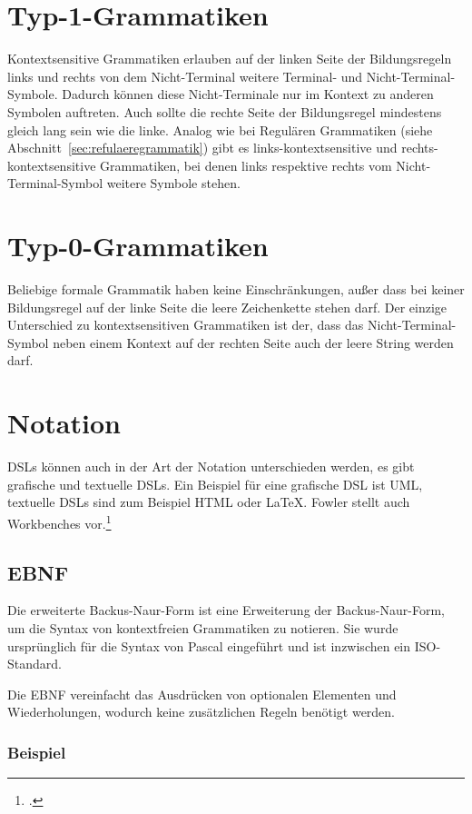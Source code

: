 \documentclass[../InterneDSLs.tex]{subfiles}
\begin{document}
\section{Typ-1-Grammatiken}\label{sec:kontextsensitivegrammatik}
Kontextsensitive Grammatiken erlauben auf der linken Seite der Bildungsregeln links und rechts von dem Nicht-Terminal weitere Terminal- und Nicht-Terminal-Symbole. Dadurch können diese Nicht-Terminale nur im Kontext zu anderen Symbolen auftreten. Auch sollte die rechte Seite der Bildungsregel mindestens gleich lang sein wie die linke. Analog wie bei Regulären Grammatiken (siehe Abschnitt~\ref{sec:refulaeregrammatik}) gibt es links-kontextsensitive und rechts-kontextsensitive Grammatiken, bei denen links respektive rechts vom Nicht-Terminal-Symbol weitere Symbole stehen.

\section{Typ-0-Grammatiken}\label{sec:beliebigegrammatik}
Beliebige formale Grammatik haben keine Einschränkungen, außer dass bei keiner Bildungsregel auf der linke Seite die leere Zeichenkette stehen darf. Der einzige Unterschied zu kontextsensitiven Grammatiken ist der, dass das Nicht-Terminal-Symbol neben einem Kontext auf der rechten Seite auch der leere String werden darf.


\section{Notation}
DSLs können auch in der Art der Notation unterschieden werden, es gibt grafische und textuelle DSLs. Ein Beispiel für eine grafische DSL ist UML, textuelle DSLs sind zum Beispiel HTML oder LaTeX. Fowler stellt auch Workbenches vor.\footcite[][S. 22ff]{Fowler.2010}

\subsection{EBNF}
Die erweiterte Backus-Naur-Form ist eine Erweiterung der Backus-Naur-Form, um die Syntax von kontextfreien Grammatiken zu notieren. Sie wurde ursprünglich für die Syntax von Pascal eingeführt und ist inzwischen ein ISO-Standard\cite{scowen1996international}.

Die EBNF vereinfacht das Ausdrücken von optionalen Elementen und Wiederholungen, wodurch keine zusätzlichen Regeln benötigt werden.

\subsubsection{Beispiel}
\end{document}
